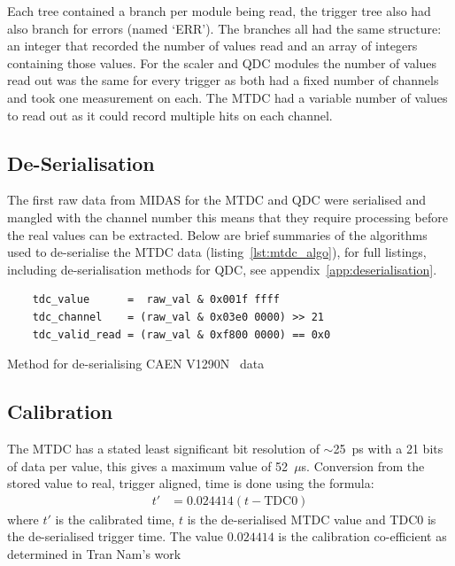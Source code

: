 Each tree contained a branch per module being read, the trigger tree also had also branch for errors (named `ERR'). The branches all had the same structure: an integer that recorded the number of values read and an array of integers containing those values. For the scaler and QDC modules the number of values read out was the same for every trigger as both had a fixed number of channels and took one measurement on each. The MTDC had a variable number of values to read out as it could record multiple hits on each channel.
\subsection{De-Serialisation} %
\label{sub:de_serialisation}
The first raw data from MIDAS for the MTDC and QDC were serialised and mangled with the channel number this means that they require processing before the real values can be extracted. Below are brief summaries of the algorithms used to de-serialise the MTDC data (listing~\ref{lst:mtdc_algo}), for full listings, including de-serialisation methods for QDC, see appendix~\ref{app:deserialisation}.
%
\begin{listing}[htbp]
    \begin{verbatim}
    tdc_value      =  raw_val & 0x001f ffff
    tdc_channel    = (raw_val & 0x03e0 0000) >> 21
    tdc_valid_read = (raw_val & 0xf800 0000) == 0x0
    \end{verbatim}
    \caption{Method for de-serialising CAEN V1290N~\cite{CAENV1290N} data}
    \label{lst:mtdc_algo}
\end{listing}
\subsection{Calibration} %
\label{sub:calibration}
The MTDC has a stated least significant bit resolution of \(\sim\)25~ps with a 21 bits of data per value, this gives a maximum value of 52~\(\mu\)s. Conversion from the stored value to real, trigger aligned, time is done using the formula:
\begin{align}\label{equ:tdc_calibration}
    t'   &= 0.024414(t - \text{TDC}0)
\end{align}
where $t'$ is the calibrated time, $t$ is the de-serialised MTDC value and TDC$0$ is the de-serialised trigger time. The value $0.024414$ is the calibration co-efficient as determined in Tran Nam's work~\cite{timecalibNam2012}

